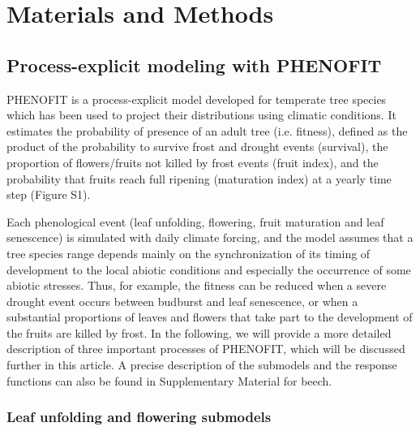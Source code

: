 \documentclass[preprint,12pt,authoryear]{elsarticle}
\begin{document}
\section{Materials and Methods}

\subsection{Process-explicit modeling with PHENOFIT}

PHENOFIT is a process-explicit model developed for temperate tree species which has been used to project their distributions using climatic conditions. It estimates the probability of presence of an adult tree (i.e. fitness), defined as the product of the probability to survive frost and drought events (survival), the proportion of flowers/fruits not killed by frost events (fruit index), and the probability that fruits reach full ripening (maturation index) at a yearly time step (Figure S1).

Each phenological event (leaf unfolding, flowering, fruit maturation and leaf senescence) is simulated with daily climate forcing, and the model assumes that a tree species range depends mainly on the synchronization of its timing of development to the local abiotic conditions and especially the occurrence of some abiotic stresses. Thus, for example, the fitness can be reduced when a severe drought event occurs between budburst and leaf senescence, or when a substantial proportions of leaves and flowers that take part to the development of the fruits are killed by frost. In the following, we will provide a more detailed description of three important processes of PHENOFIT, which will be discussed further in this article. A precise description of the submodels and the response functions can also be found in Supplementary Material for beech.

\subsubsection{Leaf unfolding and flowering submodels}
\end{document}
